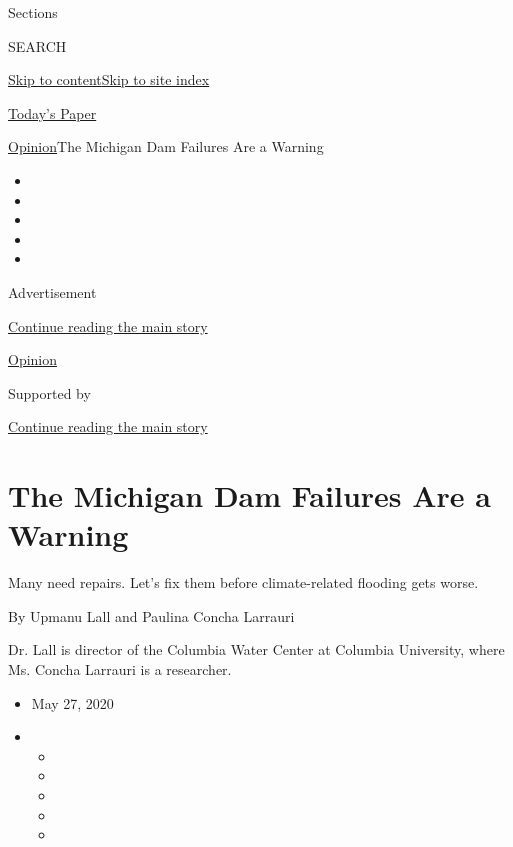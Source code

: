 Sections

SEARCH

\protect\hyperlink{site-content}{Skip to
content}\protect\hyperlink{site-index}{Skip to site index}

\href{https://myaccount.nytimes3xbfgragh.onion/auth/login?response_type=cookie\&client_id=vi}{}

\href{https://www.nytimes3xbfgragh.onion/section/todayspaper}{Today's
Paper}

\href{/section/opinion}{Opinion}\textbar{}The Michigan Dam Failures Are
a Warning

\begin{itemize}
\item
\item
\item
\item
\item
\end{itemize}

Advertisement

\protect\hyperlink{after-top}{Continue reading the main story}

\href{/section/opinion}{Opinion}

Supported by

\protect\hyperlink{after-sponsor}{Continue reading the main story}

\hypertarget{the-michigan-dam-failures-are-a-warning}{%
\section{The Michigan Dam Failures Are a
Warning}\label{the-michigan-dam-failures-are-a-warning}}

Many need repairs. Let's fix them before climate-related flooding gets
worse.

By Upmanu Lall and Paulina Concha Larrauri

Dr. Lall is director of the Columbia Water Center at Columbia
University, where Ms. Concha Larrauri is a researcher.

\begin{itemize}
\item
  May 27, 2020
\item
  \begin{itemize}
  \item
  \item
  \item
  \item
  \item
  \end{itemize}
\end{itemize}

